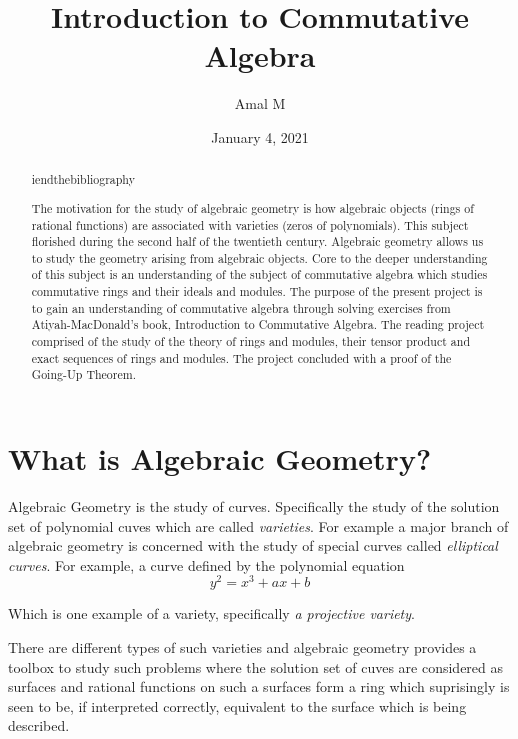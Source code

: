 \documentclass[]{report}
\begin{document}
\title{Introduction to Commutative Algebra}
\author{Amal M}
\date{January 4, 2021}
\maketitle

\begin{abstract}
iend{thebibliography}

    The motivation for the study of algebraic geometry is how algebraic objects (rings of rational functions) are associated with varieties (zeros of polynomials). This subject florished during the second half of the twentieth century. Algebraic geometry allows us to study the geometry arising from algebraic objects. Core to the deeper understanding of this subject is an understanding of the subject of commutative algebra which studies commutative rings and their ideals and modules. The purpose of the present project is to gain an understanding of commutative algebra through solving exercises from Atiyah-MacDonald's book, Introduction to Commutative Algebra. The reading project comprised of the study of the theory of rings and modules, their tensor product and exact sequences of rings and modules. The project concluded with a proof of the Going-Up Theorem.

\end{abstract}

\tableofcontents
\newpage

\chapter{What is Algebraic Geometry?}

Algebraic Geometry is the study of curves. Specifically the study of the solution set of polynomial cuves which are called \textit{varieties}. For example a major branch of algebraic geometry is concerned with the study of special curves called \textit{elliptical curves}. For example, a curve defined by the polynomial equation
    $$y^2 = x^3+ ax + b$$

Which is one example of a variety, specifically \textit{a projective variety}. 

There are different types of such varieties and algebraic geometry provides a toolbox to study such problems where the solution set of cuves are considered as surfaces and rational functions on such a surfaces form a ring which suprisingly is seen to be, if interpreted correctly, equivalent to the surface which is being described. 
\end{document}

